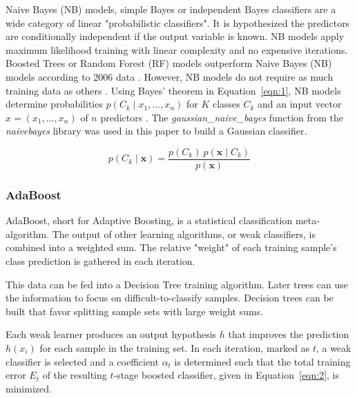 \let\LaTeXcline\cline\documentclass[sn-mathphys-num]{sn-jnl}\let\cline\LaTeXcline
\begin{document}
Naive Bayes (NB) models, simple Bayes or independent Bayes \cite{Hand2001} classifiers are a wide category of linear "probabilistic classifiers". It is hypothesized the predictors are conditionally independent if the output variable is known. NB models apply maximum likelihood training \cite{Russell1999} with linear complexity and no expensive iterations. Boosted Trees or Random Forest (RF) models outperform Naive Bayes (NB) models according to 2006 data \cite{Caruana2006}. However, NB models do not require as much training data as others \cite{John2013}. Using Bayes' theorem in Equation~\ref{eqn:1}, NB models determine probabilities $p(C_{k}\mid x_{1},\ldots, x_{n})$ for $K$ classes $C_{k}$ and an input vector $x = (x_{1},\ldots, x_{n})$ of $n$ predictors \cite{Murty2011}. The \textit{gaussian\_naive\_bayes} function from the \textit{naivebayes} library \cite{Majka2017} was used in this paper to build a Gaussian classifier.

\begin{equation}
	p(C_{k}\mid \mathbf{x})={\frac{p(C_{k})\ p(\mathbf{x} \mid C_{k})}{p(\mathbf{x})}}
	\label{eqn:1}
\end{equation}

\subsubsection{AdaBoost}

AdaBoost, short for Adaptive Boosting, is a statistical classification meta-algorithm. The output of other learning algorithms, or weak classifiers, is combined into a weighted sum. The relative "weight" of each training sample's class prediction is gathered in each iteration.

This data can be fed into a Decision Tree training algorithm. Later trees can use the information to focus on difficult-to-classify samples. Decision trees can be built that favor splitting sample sets with large weight sums.

Each weak learner produces an output hypothesis $h$ that improves the prediction $h(x_{i})$ for each sample in the training set. In each iteration, marked as $t$, a weak classifier is selected and a coefficient $\alpha_{t}$ is determined such that the total training error $E_{t}$ of the resulting $t$-stage boosted classifier, given in Equation~\ref{eqn:2}, is minimized.
 
\begin{equation}
[E_{t} = \sum_i E[F_{t-1}(x_{i}) + \alpha_{t} h(x_{i})] \label{eqn:2}
\end{equation}
 
\end{document}

